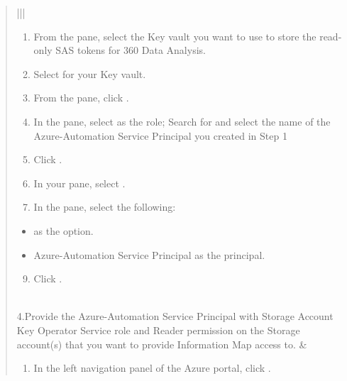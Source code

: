\documentclass[letterpaper,10pt,english]{sphinxmanual}
\begin{document}
\begin{quote}
\begin{savenotes}
\begin{tabular}[t]{|*{2}{|}}
\begin{enumerate}
\item {} 
From the  pane, select the Key vault you
want to use to store the read-only SAS tokens for
360 Data Analysis.

\item {} 
Select  for your Key vault.

\item {} 
From the  pane, click
.

\item {} 
In the  pane, select 
as the role; Search for and select the name of the
Azure-Automation Service Principal you created in Step 1

\item {} 
Click .

\item {} 
In your  pane, select 
.

\item {} 
In the  pane, select the
following:

\end{enumerate}
\begin{itemize}
\item {} 
 as the 
 option.

\item {} 
Azure-Automation Service Principal as the principal.

\end{itemize}
\begin{enumerate}
\setcounter{enumi}{8}
\item {} 
Click .

\end{enumerate}
\\
\hline
4.Provide the Azure-Automation Service
Principal with Storage Account Key
Operator Service role and Reader
permission on the Storage account(s)
that you want to provide Information
Map access to.
&\begin{enumerate}
\item {} 
In the left navigation panel of the Azure portal,
click .


\end{enumerate}
\end{tabular}
\end{savenotes}
\end{quote}
\end{document}
